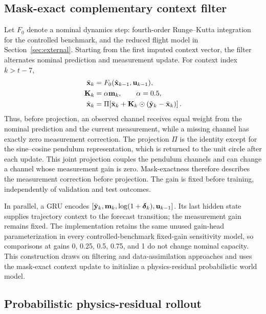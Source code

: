 \subsection{Mask-exact complementary context filter}

Let $F_0$ denote a nominal dynamics step: fourth-order Runge--Kutta integration
for the controlled benchmark, and the reduced flight model in
Section~\ref{sec:external}. Starting from the first imputed context vector, the
filter alternates nominal prediction and measurement update. For context index
$k>t-7$,
\begin{align}
 \bar{\mathbf{x}}_{k} &= F_0(\hat{\mathbf{x}}_{k-1},\mathbf{u}_{k-1}),\\
 \mathbf{K}_k &= \alpha\mathbf{m}_k,\qquad \alpha=0.5,\\
 \hat{\mathbf{x}}_k &= \Pi\!\left[
 \bar{\mathbf{x}}_k+\mathbf{K}_k\odot
 (\tilde{\mathbf{y}}_k-\bar{\mathbf{x}}_k)\right].
 \label{eq:complementary-update}
\end{align}
Thus, before projection, an observed channel receives equal weight from the
nominal prediction and the current measurement, while a missing channel has
exactly zero measurement correction. The projection $\Pi$ is the identity
except for the sine--cosine pendulum representation, which is returned to the
unit circle after each update. This joint projection couples the pendulum
channels and can change a channel whose measurement gain is zero. Mask-exactness
therefore describes the measurement correction before projection. The gain is
fixed before training, independently of validation and test outcomes.

In parallel, a GRU encodes
$[\tilde{\mathbf{y}}_k,\mathbf{m}_k,\log(1+\boldsymbol\delta_k),\mathbf{u}_{k-1}]$.
Its last hidden state supplies trajectory context to the forecast transition;
the measurement gain remains fixed. The implementation retains the
same unused gain-head parameterization in every controlled-benchmark
fixed-gain sensitivity model,
so comparisons at gains 0, 0.25, 0.5, 0.75, and 1 do not change nominal
capacity. This construction draws on filtering and data-assimilation approaches
\cite{revach2022_kalmannet,cheng2023_machine_learning_with_data_assimilation}
and uses the mask-exact context update to initialize a physics-residual
probabilistic world model.

\subsection{Probabilistic physics-residual rollout}

